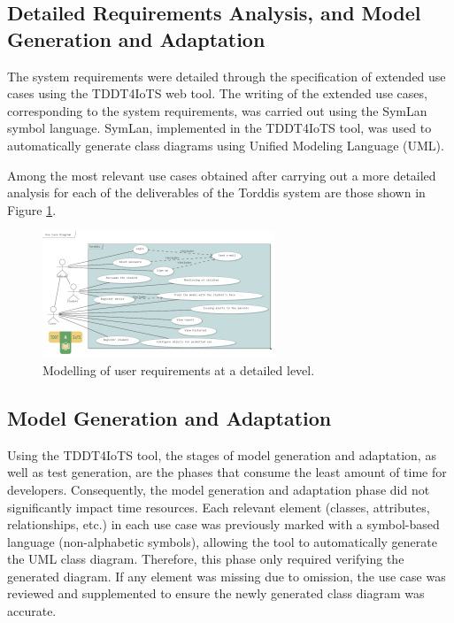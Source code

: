 \documentclass[a4paper,fleqn]{cas-sc}
\begin{document}
		\subsection{Detailed Requirements Analysis, and Model Generation and Adaptation}
			The system requirements were detailed through the specification of extended use cases using the TDDT4IoTS web tool. The writing of the extended use cases, corresponding to the system requirements, was carried out using the SymLan symbol language. SymLan, implemented in the TDDT4IoTS tool, was used to automatically generate class diagrams using Unified Modeling Language (UML). 
			
			Among the most relevant use cases obtained after carrying out a more detailed analysis for each of the deliverables of the Torddis system are those shown in  Figure \ref{fig:UseCaseDiagramFull}.
			
			\begin{figure}[hbt!]
				\centering
				\includegraphics[frame,scale=0.5, width=\linewidth]{figs/Figure_6}
				\caption{Modelling of user requirements at a detailed level.\label{fig:UseCaseDiagramFull}}
			\end{figure} 
			
		\subsection{Model Generation and Adaptation}
			Using the TDDT4IoTS tool, the stages of model generation and adaptation, as well as test generation, are the phases that consume the least amount of time for developers. Consequently, the model generation and adaptation phase did not significantly impact time resources. Each relevant element (classes, attributes, relationships, etc.) in each use case was previously marked with a symbol-based language (non-alphabetic symbols), allowing the tool to automatically generate the UML class diagram. Therefore, this phase only required verifying the generated diagram. If any element was missing due to omission, the use case was reviewed and supplemented to ensure the newly generated class diagram was accurate.
			
\end{document}
